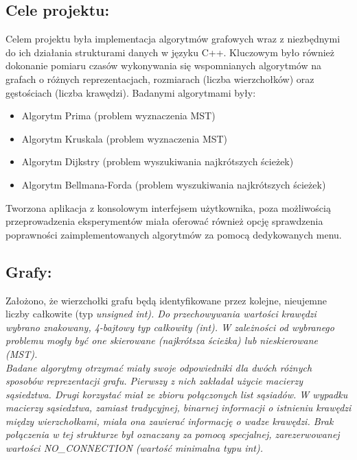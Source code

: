 \documentclass[a4paper,12pt]{article}
\begin{document}
\subsection{Cele projektu:}
Celem projektu była implementacja algorytmów grafowych wraz z niezbędnymi do ich działania strukturami danych w języku C++. Kluczowym było również dokonanie pomiaru czasów wykonywania się wspomnianych algorytmów na grafach o różnych reprezentacjach, rozmiarach (liczba wierzchołków) oraz gęstościach (liczba krawędzi). Badanymi algorytmami były:
\begin{itemize}
	\item Algorytm Prima (problem wyznaczenia MST)
	\item Algorytm Kruskala (problem wyznaczenia MST)
	\item Algorytm Dijkstry (problem wyszukiwania najkrótszych ścieżek)
	\item Algorytm Bellmana-Forda (problem wyszukiwania najkrótszych ścieżek)
\end{itemize}
\vspace{5mm}

\noindent
Tworzona aplikacja z konsolowym interfejsem użytkownika, poza możliwością przeprowadzenia eksperymentów miała oferować również opcję sprawdzenia poprawności zaimplementowanych algorytmów za pomocą dedykowanych menu.\\

\subsection{Grafy:}
Założono, że wierzchołki grafu będą identyfikowane przez kolejne, nieujemne liczby całkowite (typ \it unsigned int\rm). Do przechowywania wartości krawędzi wybrano znakowany, 4-bajtowy typ całkowity (\it int\rm). W zależności od wybranego problemu mogły być one skierowane (najkrótsza ścieżka) lub nieskierowane (MST).\\

\noindent
Badane algorytmy otrzymać miały swoje odpowiedniki dla dwóch różnych sposobów reprezentacji grafu. Pierwszy z nich zakładał użycie macierzy sąsiedztwa. Drugi korzystać miał ze zbioru połączonych list sąsiadów. W wypadku macierzy sąsiedztwa, zamiast tradycyjnej, binarnej informacji o istnieniu krawędzi między wierzchołkami, miała ona zawierać informację o wadze krawędzi. Brak połączenia w tej strukturze był oznaczany za pomocą specjalnej, zarezerwowanej wartości NO\_CONNECTION (wartość minimalna typu \it int\rm).\\
\end{document}
